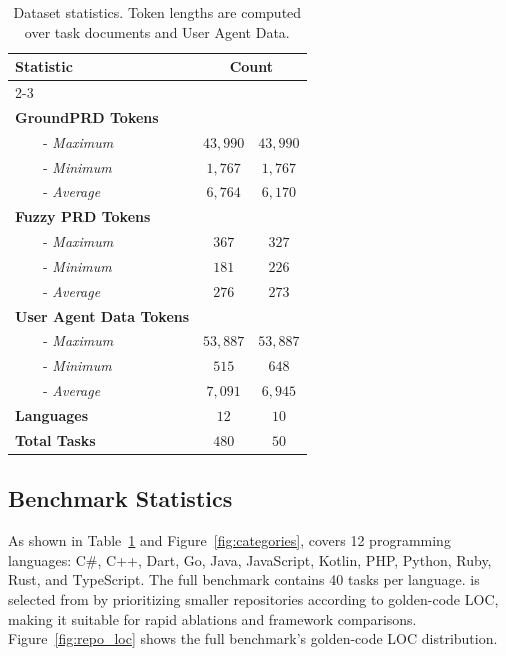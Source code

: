 \begin{table}[htbp]
\centering
\caption{Dataset statistics. Token lengths are computed over task documents and User Agent Data.}
\label{tab:dataset-statistics}
\begin{tabular}{lcc}
\toprule
\multirow{2}{*}{\textbf{Statistic}} & \multicolumn{2}{c}{\textbf{Count}} \\
\cmidrule(lr){2-3}
 & \textbf{\rcb{}} & \textbf{\rcblite{}} \\
\midrule
\textbf{GroundPRD Tokens} \\
~~~~- \textit{Maximum} & $43,990$ & $43,990$ \\
~~~~- \textit{Minimum} & $1,767$ & $1,767$ \\
~~~~- \textit{Average} & $6,764$ & $6,170$ \\
\midrule
\textbf{Fuzzy PRD Tokens} \\
~~~~- \textit{Maximum} & $367$ & $327$ \\
~~~~- \textit{Minimum} & $181$ & $226$ \\
~~~~- \textit{Average} & $276$ & $273$ \\
\midrule
\textbf{User Agent Data Tokens} \\
~~~~- \textit{Maximum} & $53,887$ & $53,887$ \\
~~~~- \textit{Minimum} & $515$ & $648$ \\
~~~~- \textit{Average} & $7,091$ & $6,945$ \\
\midrule
\textbf{Languages} & $12$ & $10$ \\
\midrule
\textbf{Total Tasks} & $480$ & $50$ \\
\bottomrule
\end{tabular}
\end{table}

\subsection{Benchmark Statistics}
\label{sec:statistics}

As shown in Table~\ref{tab:dataset-statistics} and Figure~\ref{fig:categories}, \rcb{} covers 12 programming languages: C\#, C++, Dart, Go, Java, JavaScript, Kotlin, PHP, Python, Ruby, Rust, and TypeScript. The full benchmark contains 40 tasks per language. \rcblite{} is selected from \rcb{} by prioritizing smaller repositories according to golden-code LOC, making it suitable for rapid ablations and framework comparisons. Figure~\ref{fig:repo_loc} shows the full benchmark's golden-code LOC distribution.

